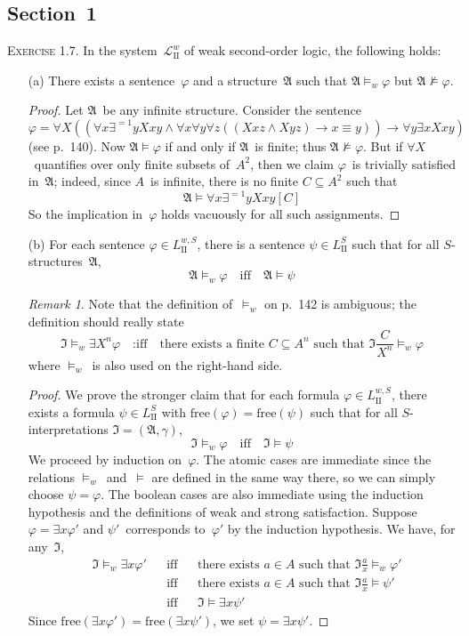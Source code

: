 \documentclass[letterpaper]{article}
\newcommand{\lequ}{\equiv}
\newcommand{\limp}{\rightarrow}
\newcommand{\I}{\mathfrak{I}}
\newcommand{\free}{\mathrm{free}}
\newcommand{\A}{\mathfrak{A}}
\renewcommand{\L}{\mathcal{L}}
\newcommand{\Ls}{\L_{\mathrm{II}}}
\newcommand{\Lsw}{\Ls^w}
\theoremstyle{remark}
\newtheorem*{rmk}{Remark}
\begin{document}
\subsection*{Section~1}
\noindent\textsc{Exercise 1.7.}
In the system~$\Lsw$ of weak second-order logic, the following holds:
\begin{enumerate}
\item[(a)] There exists a sentence~$\varphi$ and a structure~$\A$ such that $\A\models_w\varphi$ but $\A\not\models\varphi$.
\begin{proof}
Let $\A$~be any infinite structure. Consider the sentence
$$\varphi=\forall X((\forall x\exists^{=1}y Xxy\land\forall x\forall y\forall z((Xxz\land Xyz)\limp x\lequ y))\limp\forall y\exists x Xxy)$$
(see p.~140). Now $\A\models\varphi$ if and only if $\A$~is finite; thus $\A\not\models\varphi$. But if $\forall X$~quantifies over only finite subsets of~$A^2$, then we claim $\varphi$~is trivially satisfied in~$\A$; indeed, since $A$~is infinite, there is no finite $C\subseteq A^2$ such that
$$\A\models\forall x\exists^{=1}y Xxy[C]$$
So the implication in~$\varphi$ holds vacuously for all such assignments.
\end{proof}
\item[(b)] For each sentence $\varphi\in L_{\mathrm{II}}^{w,S}$, there is a sentence $\psi\in L_{\mathrm{II}}^S$ such that for all $S$-structures~$\A$,
$$\A\models_w\varphi\quad\text{iff}\quad\A\models\psi$$

\begin{rmk}
Note that the definition of~$\models_w$ on p.~142 is ambiguous; the definition should really state
$$\I\models_w\exists X^n\varphi\quad\text{:iff}\quad\text{there exists a finite $C\subseteq A^n$ such that $\I\frac{C}{X^n}\models_w\varphi$}$$
where $\models_w$~is also used on the right-hand side.
\end{rmk}
\begin{proof}
We prove the stronger claim that for each formula $\varphi\in L_{\mathrm{II}}^{w,S}$, there exists a formula $\psi\in L_{\mathrm{II}}^S$ with $\free(\varphi)=\free(\psi)$ such that for all $S$-interpretations $\I=(\A,\gamma)$,
$$\I\models_w\varphi\quad\text{iff}\quad\I\models\psi$$
We proceed by induction on~$\varphi$. The atomic cases are immediate since the relations $\models_w$~and~$\models$ are defined in the same way there, so we can simply choose $\psi=\varphi$. The boolean cases are also immediate using the induction hypothesis and the definitions of weak and strong satisfaction. Suppose $\varphi=\exists x\varphi'$ and $\psi'$~corresponds to~$\varphi'$ by the induction hypothesis. We have, for any~$\I$,
\begin{align*}
&\I\models_w\exists x\varphi'&&\text{iff}&&\text{there exists $a\in A$ such that $\I\tfrac{a}{x}\models_w\varphi'$}\\
    &&&\text{iff}&&\text{there exists $a\in A$ such that $\I\tfrac{a}{x}\models\psi'$}\\
    &&&\text{iff}&&\I\models\exists x\psi'
\end{align*}
Since $\free(\exists x\varphi')=\free(\exists x\psi')$, we set $\psi=\exists x\psi'$.


\end{proof}
\end{enumerate}
\end{document}
